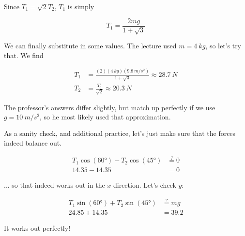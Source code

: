 Since $T_1 = \sqrt{2} T_2$, $T_1$ is simply

\begin{equation}
T_1 = \frac{2 m g}{1 + \sqrt{3}}
\end{equation}

We can finally substitute in some values. The lecture used $m = \SI{4}{kg}$, so let's try that. We find

\begin{align}
T_1 &= \frac{(2)(\SI{4}{kg})(\SI{9.8}{m/s^2})}{1 + \sqrt{3}} \approx \SI{28.7}{N}\\
T_2 &= \frac{T_1}{\sqrt{2}} \approx \SI{20.3}{N}
\end{align}

The professor's answers differ slightly, but match up perfectly if we use $g = \SI{10}{m/s^2}$, so he most likely used that approximation.

As a sanity check, and additional practice, let's just make sure that the forces indeed balance out.

\begin{align}
T_1 \cos(\ang{60}) - T_2 \cos(\ang{45}) &\overset{?}{=} 0\\
14.35 - 14.35 &= 0
\end{align}

... so that indeed works out in the $x$ direction. Let's check $y$:

\begin{align}
T_1 \sin(\ang{60}) + T_2 \sin(\ang{45}) &\overset{?}{=} m g\\
24.85 + 14.35 &= 39.2
\end{align}

It works out perfectly!
